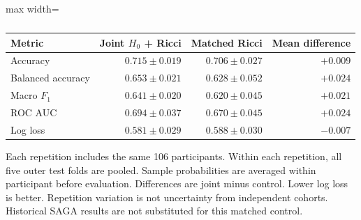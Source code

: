 \begin{table}[!htbp]
\centering\small
\caption{}
\label{tab:joint-v8-participant}
\begingroup\bfseries\boldmath
\begin{adjustbox}{max width=\linewidth}
\begin{tabular}{lrrr}
\toprule
Metric & Joint $H_0$ + Ricci & Matched Ricci & Mean difference \\
\midrule
Accuracy & $0.715 \pm 0.019$ & $0.706 \pm 0.027$ & $+0.009$ \\
Balanced accuracy & $0.653 \pm 0.021$ & $0.628 \pm 0.052$ & $+0.024$ \\
Macro $F_1$ & $0.641 \pm 0.020$ & $0.620 \pm 0.045$ & $+0.021$ \\
ROC AUC & $0.694 \pm 0.037$ & $0.670 \pm 0.045$ & $+0.024$ \\
Log loss & $0.581 \pm 0.029$ & $0.588 \pm 0.030$ & $-0.007$ \\
\bottomrule
\end{tabular}
\end{adjustbox}
\par\smallskip\begin{minipage}{0.98\linewidth}\footnotesize Each repetition includes the same 106 participants. Within each repetition, all five outer test folds are pooled. Sample probabilities are averaged within participant before evaluation. Differences are joint minus control. Lower log loss is better. Repetition variation is not uncertainty from independent cohorts. Historical SAGA results are not substituted for this matched control.
\end{minipage}
\endgroup
\end{table}
